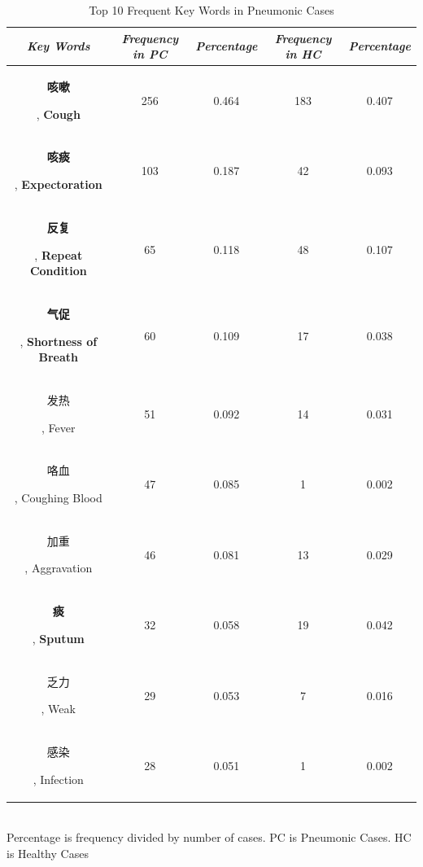\documentclass[journal]{IEEEtran}
\begin{document}
\begin{table}[htb]
\vspace{-0cm}
\caption{Top 10 Frequent Key Words in Pneumonic Cases}
\vspace{-0cm}
\begin{center}
\begin{tabular}{|c|c|c|c|c|}
    \hline
    \textbf{\textit{Key Words}} & \textbf{\textit{Frequency in PC}} & \textbf{\textit{Percentage}}& \textbf{\textit{Frequency in HC}}& \textbf{\textit{Percentage}} \\
\hline
\begin{CJK}{UTF8}{gbsn}\textbf{咳嗽}\end{CJK}, \textbf{Cough} & 256 & 0.464 & 183 & 0.407\\
\begin{CJK}{UTF8}{gbsn}\textbf{咳痰}\end{CJK}, \textbf{Expectoration} & 103 & 0.187 & 42 & 0.093\\
\begin{CJK}{UTF8}{gbsn}\textbf{反复}\end{CJK}, \textbf{Repeat Condition} & 65 & 0.118 & 48 & 0.107\\
\begin{CJK}{UTF8}{gbsn}\textbf{气促}\end{CJK}, \textbf{Shortness of Breath} & 60 & 0.109 & 17 & 0.038\\
\begin{CJK}{UTF8}{gbsn}发热\end{CJK}, Fever & 51 & 0.092 & 14 & 0.031\\
\begin{CJK}{UTF8}{gbsn}咯血\end{CJK}, Coughing Blood & 47 & 0.085 & 1 & 0.002\\
\begin{CJK}{UTF8}{gbsn}加重\end{CJK}, Aggravation & 46 & 0.081 & 13 & 0.029\\
\begin{CJK}{UTF8}{gbsn}\textbf{痰}\end{CJK}, \textbf{Sputum} & 32 & 0.058 & 19 & 0.042\\
\begin{CJK}{UTF8}{gbsn}乏力\end{CJK}, Weak& 29 & 0.053 & 7 & 0.016\\
\begin{CJK}{UTF8}{gbsn}感染\end{CJK}, Infection& 28 & 0.051 & 1 & 0.002\\

\hline
\end{tabular}
\vspace{0.1cm}
\label{frequency1}\\
\footnotesize{Percentage is frequency divided by number of cases. PC is Pneumonic Cases. HC is Healthy Cases}

\end{center}
\vspace{-0.0cm}
\end{table}
\end{document}
